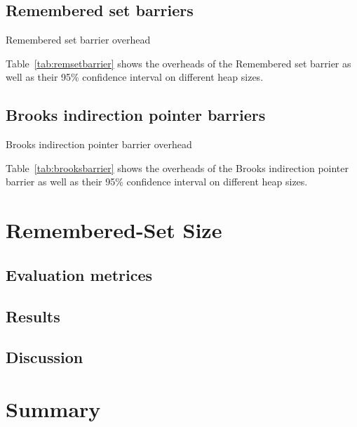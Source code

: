 
\subsection{Remembered set barriers}

\begin{table*}
  \centering
  
  \caption{Remembered set barrier overhead}
  \label{tab:remsetbarrier}
\end{table*}

Table~\ref{tab:remsetbarrier} shows the overheads of the Remembered set barrier
as well as their 95\% confidence interval on different heap sizes.


\subsection{Brooks indirection pointer barriers}

\begin{table*}
  \centering
  
  \caption{Brooks indirection pointer barrier overhead}
  \label{tab:brooksbarrier}
\end{table*}

Table~\ref{tab:brooksbarrier} shows the overheads of the Brooks indirection pointer barrier
as well as their 95\% confidence interval on different heap sizes.


\section{Remembered-Set Size} %
\label{sec:remsetsize}

\subsection{Evaluation metrices}
\subsection{Results}
\subsection{Discussion}

\section{Summary} %
\label{sec:summary}

